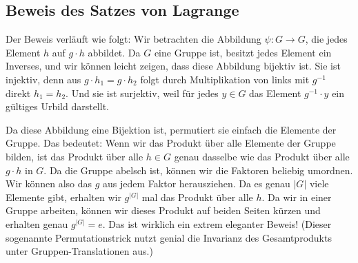\begin{math-stroke}
\end{math-stroke}

\subsection{Beweis des Satzes von Lagrange}

\begin{spoken-clean}[00:41:36 - 00:44:16]
Der Beweis verläuft wie folgt: Wir betrachten die Abbildung $\psi \colon G \to G$, die jedes Element $h$ auf $g \cdot h$ abbildet. Da $G$ eine Gruppe ist, besitzt jedes Element ein Inverses, und wir können leicht zeigen, dass diese Abbildung bijektiv ist. Sie ist injektiv, denn aus $g \cdot h_1 = g \cdot h_2$ folgt durch Multiplikation von links mit $g^{-1}$ direkt $h_1 = h_2$. Und sie ist surjektiv, weil für jedes $y \in G$ das Element $g^{-1} \cdot y$ ein gültiges Urbild darstellt.

Da diese Abbildung eine Bijektion ist, permutiert sie einfach die Elemente der Gruppe. Das bedeutet: Wenn wir das Produkt über alle Elemente der Gruppe bilden, ist das Produkt über alle $h \in G$ genau dasselbe wie das Produkt über alle $g \cdot h$ in $G$. Da die Gruppe abelsch ist, können wir die Faktoren beliebig umordnen. Wir können also das $g$ aus jedem Faktor herausziehen. Da es genau $|G|$ viele Elemente gibt, erhalten wir $g^{|G|}$ mal das Produkt über alle $h$. Da wir in einer Gruppe arbeiten, können wir dieses Produkt auf beiden Seiten kürzen und erhalten genau $g^{|G|} = e$. Das ist wirklich ein extrem eleganter Beweis! (Dieser sogenannte Permutationstrick nutzt genial die Invarianz des Gesamtprodukts unter Gruppen-Translationen aus.)
\end{spoken-clean}

